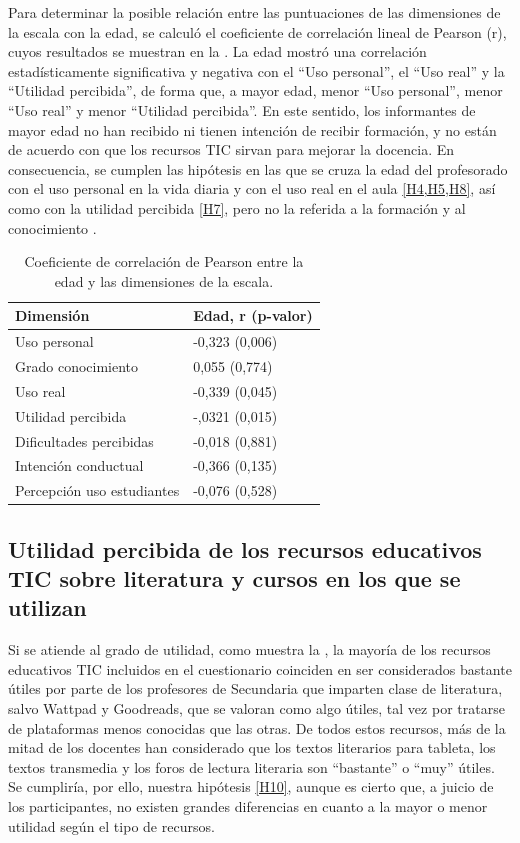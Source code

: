 \documentclass[spanish]{textolivre}
\begin{document}
Para determinar la posible relación entre las puntuaciones de las dimensiones de la escala con la edad, se calculó el coeficiente de correlación lineal de Pearson (r), cuyos resultados se muestran en la . La edad mostró una correlación estadísticamente significativa y negativa con el “Uso personal”, el “Uso real” y la “Utilidad percibida”, de forma que, a mayor edad, menor “Uso personal”, menor “Uso real” y menor “Utilidad percibida”. En este sentido, los informantes de mayor edad no han recibido ni tienen intención de recibir formación, y no están de acuerdo con que los recursos TIC sirvan para mejorar la docencia. En consecuencia, se cumplen las hipótesis en las que se cruza la edad del profesorado con el uso personal en la vida diaria y con el uso real en el aula \cref{H4,H5,H8}, así como con la utilidad percibida \cref{H7}, pero no la referida a la formación y al conocimiento . 

\begin{table}[htbp]
\caption{Coeficiente de correlación de Pearson entre la edad y las dimensiones de la escala.}
\label{tbl05}
\centering
\begin{tabular}{ll}
\toprule
Dimensión & Edad, r (p-valor) \\
\midrule 
Uso personal & -0,323 (0,006) \\
Grado conocimiento & 0,055 (0,774) \\
Uso real & -0,339 (0,045) \\
Utilidad percibida & -,0321 (0,015) \\
Dificultades percibidas & -0,018 (0,881) \\
Intención conductual & -0,366 (0,135) \\
Percepción uso estudiantes & -0,076 (0,528) \\
\bottomrule
\end{tabular}
\end{table}


\subsection{Utilidad percibida de los recursos educativos TIC sobre literatura y cursos en los que se utilizan}\label{sec-autores}
Si se atiende al grado de utilidad, como muestra la , la mayoría de los recursos educativos TIC incluidos en el cuestionario coinciden en ser considerados bastante útiles por parte de los profesores de Secundaria que imparten clase de literatura, salvo Wattpad y Goodreads, que se valoran como algo útiles, tal vez por tratarse de plataformas menos conocidas que las otras. De todos estos recursos, más de la mitad de los docentes han considerado que los textos literarios para tableta, los textos transmedia y los foros de lectura literaria son “bastante” o “muy” útiles. Se cumpliría, por ello, nuestra hipótesis \ref{H10}, aunque es cierto que, a juicio de los participantes, no existen grandes diferencias en cuanto a la mayor o menor utilidad según el tipo de recursos.
\end{document}
